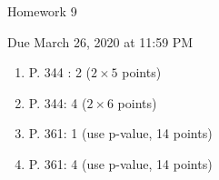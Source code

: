 \documentclass{article}
\begin{document}
\begin{center} \LARGE
Homework 9
\end{center}
\begin{center} \Large
Due March 26, 2020 at 11:59 PM 
\end{center}



\begin{enumerate}
	
	\item P. 344 : 2 ($2 \times 5$ points)
	\item P. 344: 4 ($2 \times 6$ points)
	\item P. 361: 1 (use p-value, 14 points)
	\item P. 361: 4 (use p-value, 14 points)

\end{enumerate}

% 
%
\end{document}
